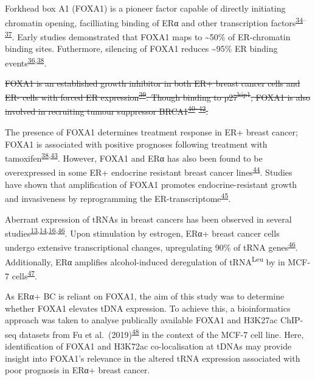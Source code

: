 \documentclass[
  12pt,
]{article}
\begin{document}
Forkhead box A1 (FOXA1) is a pioneer factor capable of directly initiating chromatin opening, facilliating binding of ERα and other transcription factors\textsuperscript{\protect\hyperlink{ref-Costa1989}{34}--\protect\hyperlink{ref-laganiuxe8re2005}{37}}.
Early studies demonstrated that FOXA1 maps to \textasciitilde50\% of ER-chromatin binding sites.
Futhermore, silencing of FOXA1 reduces \textasciitilde95\% ER binding events\textsuperscript{\protect\hyperlink{ref-carroll2005}{36},\protect\hyperlink{ref-Hurtado2011}{38}}.

\sout{FOXA1 is an established growth inhibitor in both ER+ breast cancer cells and ER- cells with forced ER expression\textsuperscript{\protect\hyperlink{ref-Wolf2007}{39}}. Though binding to p27\textsuperscript{kip1}, FOXA1 is also involved in recruiting tumour suppressor BRCA1\textsuperscript{\protect\hyperlink{ref-Williamson2006}{40}--\protect\hyperlink{ref-Fredersdorf1997}{42}}.}

The presence of FOXA1 determines treatment response in ER+ breast cancer; FOXA1 is associated with positive prognoses following treatment with tamoxifen\textsuperscript{\protect\hyperlink{ref-Hurtado2011}{38},\protect\hyperlink{ref-Badve2007}{43}}.
However, FOXA1 and ERα has also been found to be overexpressed in some ER+ endocrine resistant breast cancer lines\textsuperscript{\protect\hyperlink{ref-ross-innes2012}{44}}.
Studies have shown that amplification of FOXA1 promotes endocrine-resistant growth and invasiveness by reprogramming the ER-transcriptome\textsuperscript{\protect\hyperlink{ref-Fu2016}{45}}.

Aberrant expression of tRNAs in breast cancers has been observed in several studies\textsuperscript{\protect\hyperlink{ref-Zhang2018}{13},\protect\hyperlink{ref-Pavon-Eternod2009}{14},\protect\hyperlink{ref-Krishnan2016}{16},\protect\hyperlink{ref-Hah2011}{46}}.
Upon stimulation by estrogen, ERα+ breast cancer cells undergo extensive transcriptional changes, upregulating 90\% of tRNA genes\textsuperscript{\protect\hyperlink{ref-Hah2011}{46}}.
Additionally, ERα amplifies alcohol-induced deregulation of tRNA\textsuperscript{Leu} by in MCF-7 cells\textsuperscript{\protect\hyperlink{ref-zhong2014}{47}}.

As ERα+ BC is reliant on FOXA1, the aim of this study was to determine whether FOXA1 elevates tDNA expression.
To achieve this, a bioinformatics approach was taken to analyse publically available FOXA1 and H3K27ac ChIP-seq datasets from Fu et al.~(2019)\textsuperscript{\protect\hyperlink{ref-fu2019}{48}} in the context of the MCF-7 cell line.
Here, identification of FOXA1 and H3K72ac co-localisation at tDNAs may provide insight into FOXA1's relevance in the altered tRNA expression associated with poor prognosis in ERα+ breast cancer.
\end{document}

